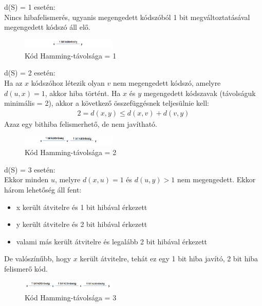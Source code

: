 \documentclass[margin=0px]{article}
\begin{document}
\begin{description}
\begin{itemize}
						d(S) = 1 esetén: \\
						Nincs hibafelismerés, ugyanis megengedett kódszóból 1 bit megváltoztatásával megengedett kódszó áll elő.
						\begin{figure}[H]
							\centering
							\includegraphics[width=0.4\textwidth]{img/hamming1.png}
							\caption{Kód Hamming-távolsága = 1}	
						\end{figure}
						d(S) = 2 esetén: \\
						Ha az $x$ kódszóhoz létezik olyan $v$ nem megengedett kódszó, amelyre $d(u,x)=1$, akkor hiba történt. Ha $x$ és $y$ megengedett kódszavak (távolságuk minimális = 2), akkor a következő összefüggésnek teljesülnie kell:
						\begin{align*}
							2 = d(x,y) \leq d(x,v)+d(v,y)
						\end{align*}
						Azaz egy bithiba felismerhető, de nem javítható.
						\begin{figure}[H]
							\centering
							\includegraphics[width=0.4\textwidth]{img/hamming2.png}
							\caption{Kód Hamming-távolsága = 2}	
						\end{figure}
						
						d(S) = 3 esetén: \\
						Ekkor minden $u$, melyre $d(x,u)=1$ és $d(u,y) > 1$ nem megengedett. Ekkor három lehetőség áll fent:
						\begin{itemize}
							\item x került átvitelre és 1 bit hibával érkezett
							\item y került átvitelre és 2 bit hibával érkezett
							\item valami más került átvitelre és legalább 2 bit hibával érkezett
						\end{itemize}
						De valószínűbb, hogy $x$ került átvitelre, tehát ez egy 1 bit hiba javító, 2 bit hiba felismerő kód.
						\begin{figure}[H]
							\centering
							\includegraphics[width=0.4\textwidth]{img/hamming3.png}
							\caption{Kód Hamming-távolsága = 3}	
						\end{figure}
						

\end{itemize}
\end{description}
\end{document}
